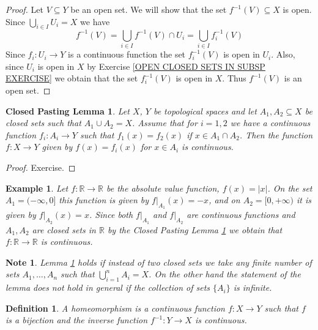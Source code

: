 \documentclass[11pt, letterpaper, oneside]{report}
\theoremstyle{pplain}
\newtheorem{CPASTINGL}[theorem]{Closed Pasting Lemma}
\newtheorem{ITERMVALUE THM}[theorem]{Intermediate Value Theorem}
\newtheorem{HEINEBOREL THM}[theorem]{Heine-Borel Theorem}
\newtheorem{UMETR THM}[theorem]{Urysohn Metrization Theorem}
\newtheorem{UMETR2 THM}[theorem]{Urysohn Metrization Theorem (v.2)}
\theoremstyle{ddefinition}
\newtheorem{definition}[theorem]{Definition}
\newtheorem{example}[theorem]{Example}
\newtheorem{note}[theorem]{Note}
\theoremstyle{nnn}
\newtheorem{TDA NN}[theorem]{Topological Data Analysis. }
\theoremstyle{eexercise}
\newcommand{\R}{{\mathbb R}}
\begin{document}
\begin{proof}
Let $V\subseteq Y$ be an open set. We will show that the set $f^{-1}(V)\subseteq X$ is open. 
Since $\bigcup_{i\in I}U_{i}= X$ we have 
$$f^{-1}(V) = \bigcup_{i\in I} f^{-1}(V)\cap U_{i} =\bigcup_{i\in I} f_{i}^{-1}(V)$$ 
Since $f_{i}\colon U_{i}\to Y$ is a continuous function the set $ f_{i}^{-1}(V)$ is open in $U_{i}$. 
Also, since $U_{i}$ is open in $X$  by Exercise \ref{OPEN CLOSED SETS IN SUBSP EXERCISE}
we obtain that the set $f^{-1}_{i}(V)$ is open in $X$. Thus $f^{-1}(V)$ is an open set.   
\end{proof}


\begin{CPASTINGL}
\label{CLOSED PASTING LEMMA}
Let $X$, $Y$ be topological spaces and let $A_{1}, A_{2}\subseteq X$ be  closed sets
such that $A_{1}\cup A_{2} = X$. Assume that for  $i = 1, 2$ we have a continuous 
function  $f_{i}\colon A_{i}\to Y$ such that $f_{1}(x) = f_{2}(x)$ if $x\in A_{1}\cap A_{2}$. 
Then the function $f\colon X\to Y$  given by $f(x) = f_{i}(x)$ for  $x\in A_{i}$ is continuous. 
\end{CPASTINGL}

\begin{proof}
Exercise.
\end{proof}

\begin{example}
Let $f \colon \R\to \R$ be the absolute value function,  $f(x) = |{x}|$.  On the set $A_{1} = (-\infty, 0]$ 
this function is given by $f|_{A_{1}}(x) = -x$, and on $A_{2} = [0, +\infty)$ it is given by $f|_{A_{2}}(x) = x$. Since both  
$f|_{A_{1}}$ and $f|_{A_{2}}$ are continuous functions and $A_{1}, A_{2}$ are closed sets in $\R$  by the 
Closed Pasting Lemma   \ref{CLOSED PASTING LEMMA} we obtain that $f\colon \R\to \R$ is continuous. 
\end{example}

\begin{note}
Lemma \ref{CLOSED PASTING LEMMA}  holds if instead of two closed sets we take 
any  finite number of sets $A_{1}, \dots, A_{n}$ such that $\bigcup_{i=1}^{n} A_{i} = X$. 
On the other hand the statement of the lemma does not hold in general if the collection  
of sets $\{A_{i}\}$ is infinite. 
\end{note}



\begin{definition}
A \emph{homeomorphism} is a continuous function $f\colon X\to Y$ such that 
$f$ is a bijection and the inverse function $f^{-1}\colon Y\to X$ is continuous.
\end{definition}
\end{document}
